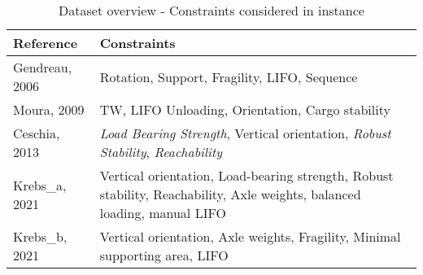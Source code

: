 \begin{table}[!ht]
    \centering
    \small
    \begin{tabular}{@{}lp{}@{}}
        \toprule
        \textbf{Reference} & \textbf{Constraints}                                                                                                     \\
        \midrule
        Gendreau, 2006     & Rotation, Support, Fragility, LIFO, Sequence                                                                             \\
        Moura, 2009        & TW, LIFO Unloading, Orientation, Cargo stability                                                                         \\
        Ceschia, 2013      & \textit{Load Bearing Strength}, Vertical orientation, \textit{Robust Stability}, \textit{Reachability}                   \\
        Krebs\_a, 2021     & Vertical orientation, Load-bearing strength, Robust stability, Reachability, Axle weights, balanced loading, manual LIFO \\
        Krebs\_b, 2021     & Vertical orientation, Axle weights, Fragility, Minimal supporting area, LIFO                                             \\
        \bottomrule
    \end{tabular}
    \caption{Dataset overview - Constraints considered in instance}
    \label{tab:constraints_cvrp_instances}
\end{table}